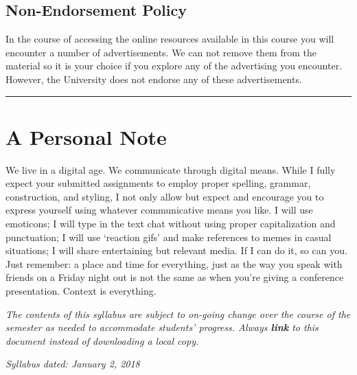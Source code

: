 \documentclass[]{article}
\begin{document}
\hypertarget{non-endorsement-policy}{%
\subsection{Non-Endorsement Policy}\label{non-endorsement-policy}}

In the course of accessing the online resources available in this course
you will encounter a number of advertisements. We can not remove them
from the material so it is your choice if you explore any of the
advertising you encounter. However, the University does not endorse any
of these advertisements.

\begin{center}\rule{0.5\linewidth}{\linethickness}\end{center}

\hypertarget{a-personal-note}{%
\section{A Personal Note}\label{a-personal-note}}

We live in a digital age. We communicate through digital means. While I
fully expect your submitted assignments to employ proper spelling,
grammar, construction, and styling, I not only allow but expect and
encourage you to express yourself using whatever communicative means you
like. I will use emoticons; I will type in the text chat without using
proper capitalization and punctuation; I will use `reaction gifs' and
make references to memes in casual situations; I will share entertaining
but relevant media. If I can do it, so can you. Just remember: a place
and time for everything, just as the way you speak with friends on a
Friday night out is not the same as when you're giving a conference
presentation. Context is everything.

\emph{The contents of this syllabus are subject to on-going change over
the course of the semester as needed to accommodate students' progress.
Always \textbf{\emph{link}} to this document instead of downloading a
local copy.}

\emph{Syllabus dated: \emph{January 2, 2018}}
\end{document}
